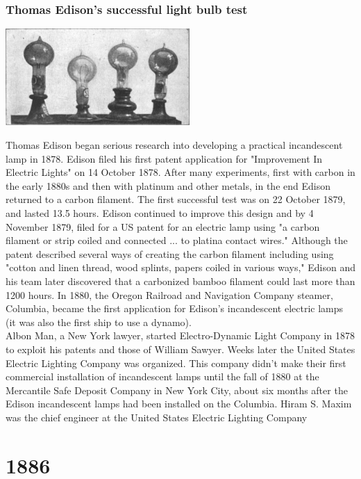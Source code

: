\documentclass[11pt]{report}
\begin{document}
\subsection{Thomas Edison's successful light bulb test}
\vspace{2mm}\begin{center}\includegraphics[width=7cm]{./img/edisonsBulb.jpg}\end{center}
Thomas Edison began serious research into developing a practical incandescent lamp in 1878. Edison filed his first patent application for "Improvement In Electric Lights" on 14 October 1878. After many experiments, first with carbon in the early 1880s and then with platinum and other metals, in the end Edison returned to a carbon filament. The first successful test was on 22 October 1879, and lasted 13.5 hours. Edison continued to improve this design and by 4 November 1879, filed for a US patent for an electric lamp using "a carbon filament or strip coiled and connected ... to platina contact wires." Although the patent described several ways of creating the carbon filament including using "cotton and linen thread, wood splints, papers coiled in various ways," Edison and his team later discovered that a carbonized bamboo filament could last more than 1200 hours. In 1880, the Oregon Railroad and Navigation Company steamer, Columbia, became the first application for Edison's incandescent electric lamps (it was also the first ship to use a dynamo).\\ \indent Albon Man, a New York lawyer, started Electro-Dynamic Light Company in 1878 to exploit his patents and those of William Sawyer. Weeks later the United States Electric Lighting Company was organized. This company didn't make their first commercial installation of incandescent lamps until the fall of 1880 at the Mercantile Safe Deposit Company in New York City, about six months after the Edison incandescent lamps had been installed on the Columbia. Hiram S. Maxim was the chief engineer at the United States Electric Lighting Company

\chapter{1886}
\end{document}
